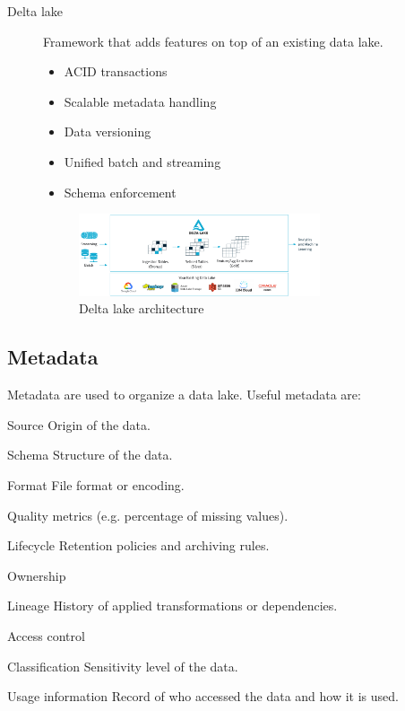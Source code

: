 \begin{description}
    \item[Delta lake] 
        Framework that adds features on top of an existing data lake.
        \begin{itemize}
            \item ACID transactions
            \item Scalable metadata handling
            \item Data versioning
            \item Unified batch and streaming
            \item Schema enforcement
        \end{itemize}
        \begin{figure}[ht]
            \centering
            \includegraphics[width=0.7\textwidth]{img/delta_lake.png}
            \caption{Delta lake architecture}
        \end{figure}
\end{description}


\subsection{Metadata}
Metadata are used to organize a data lake.
Useful metadata are:
\begin{descriptionlist}
    \item[Source] Origin of the data.
    \item[Schema] Structure of the data.
    \item[Format] File format or encoding.
    \item[Quality metrics] (e.g. percentage of missing values).
    \item[Lifecycle] Retention policies and archiving rules.
    \item[Ownership] 
    \item[Lineage] History of applied transformations or dependencies.
    \item[Access control] 
    \item[Classification] Sensitivity level of the data.
    \item[Usage information] Record of who accessed the data and how it is used.
\end{descriptionlist}